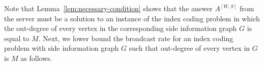 \documentclass[letterpaper, 10 pt, conference]{ieeeconf}
\newcommand{\A}[2]{A^{[#1,#2]}} %
\begin{document}



Note that Lemma~\ref{lem:necessary-condition} shows that the answer $\A{W}{S}$ from the server must be a solution to an instance of the index coding problem in which the out-degree of every vertex in the corresponding side information graph $G$ is equal to $M$. %
Next, we lower bound the broadcast rate for an index coding problem with side information graph $G$ such that out-degree of every vertex in $G$ is $M$ as follows.




\end{document}
